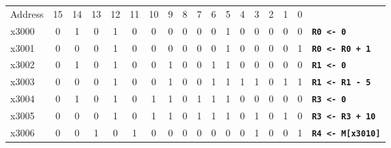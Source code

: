 \documentclass{patt}
\begin{document}
\FloatBarrier
\setcounter{figure}{8}
\begin{figure}
\noindent\small
\begin{minipage}{36pc}
\begin{center}
\renewcommand{\tabcolsep}{6pt}%
\begin{tabular}{@{}l c c c c c c c c c c c c c c c c l }
Address & 15 & 14 & 13 & \hfill{12} & 11 & 10 & 9 & 8 & 7 & 6 & 5 & 4 & 3 & 2 & 1 & 0 \\
\cline{2-17}
x3000 & \multicolumn{1}{|c}{0} & 1 & 0 & \multicolumn{1}{c|}{1} & 0 & 0 & \multicolumn{1}{c|}{0} & 0 & 0 & \multicolumn{1}{c|}{0} & \multicolumn{1}{c|}{1} & 0 & 0 & 0 & 0 & \multicolumn{1}{c|}{0} & \multicolumn{1}{l}{\tt\bfseries R0 <- 0} \\
\cline{2-17}
x3001 & \multicolumn{1}{|c}{0} & 0 & 0 & \multicolumn{1}{c|}{1} & 0 & 0 & \multicolumn{1}{c|}{0} & 0 & 0 & \multicolumn{1}{c|}{0} & \multicolumn{1}{c|}{1} & 0 & 0 & 0 & 0 & \multicolumn{1}{c|}{1} & \multicolumn{1}{l}{\tt\bfseries R0 <- R0 + 1}\\
\cline{2-17}
x3002 & \multicolumn{1}{|c}{0} & 1 & 0 & \multicolumn{1}{c|}{1} & 0 & 0 & \multicolumn{1}{c|}{1} & 0 & 0 & \multicolumn{1}{c|}{1} & \multicolumn{1}{c|}{1} & 0 & 0 & 0 & 0 & \multicolumn{1}{c|}{0} & \multicolumn{1}{l}{\tt\bfseries R1 <- 0} \\
\cline{2-17}
x3003 & \multicolumn{1}{|c}{0} & 0 & 0 & \multicolumn{1}{c|}{1} & 0 & 0 & \multicolumn{1}{c|}{1} & 0 & 0 & \multicolumn{1}{c|}{1} & \multicolumn{1}{c|}{1} & 1 & 1 & 0 & 1 & \multicolumn{1}{c|}{1} & \multicolumn{1}{l}{\tt\bfseries R1 <- R1 - 5}\\
\cline{2-17}
x3004 & \multicolumn{1}{|c}{0} & 1 & 0 & \multicolumn{1}{c|}{1} & 0 & 1 & \multicolumn{1}{c|}{1} & 0 & 1 & \multicolumn{1}{c|}{1} & \multicolumn{1}{c|}{1} & 0 & 0 & 0 & 0 & \multicolumn{1}{c|}{0} & \multicolumn{1}{l}{\tt\bfseries R3 <- 0}\\
\cline{2-17}
x3005 & \multicolumn{1}{|c}{0} & 0 & 0 & \multicolumn{1}{c|}{1} & 0 & 1 & \multicolumn{1}{c|}{1} & 0 & 1 & \multicolumn{1}{c|}{1} & \multicolumn{1}{c|}{1} & 0 & 1 & 0 & 1 & \multicolumn{1}{c|}{0} & \multicolumn{1}{l}{\tt\bfseries R3 <- R3 + 10}\\
\cline{2-17}
x3006 & \multicolumn{1}{|c}{0} & 0 & 1 & \multicolumn{1}{c|}{0} & 1 & 0 & \multicolumn{1}{c|}{0} & 0 & 0 & 0 & 0 & 0 & 1 & 0 & 0 & \multicolumn{1}{c|}{1} & \multicolumn{1}{l}{\tt\bfseries R4 <- M[x3010]}\\

\end{tabular}
\end{center}
\end{minipage}
\end{figure}
\end{document}
